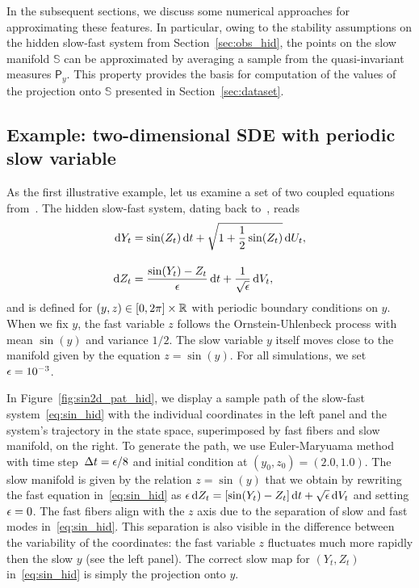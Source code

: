 \documentclass{article}
\newcommand{\sman}{\mathbb{S}} %
\newcommand{\invm}{\mathsf{P}} %
\begin{document}
In the subsequent sections, we discuss some numerical approaches for approximating these features. In particular, owing to the stability assumptions on the hidden slow-fast system from Section~\ref{sec:obs_hid}, the points on the slow manifold $\sman$ can be approximated by averaging a sample from the quasi-invariant measures $\invm_{\!y}$. This property provides the basis for computation of the values of the projection onto $\sman$ presented in Section~\ref{sec:dataset}.

\subsection{Example: two-dimensional SDE with periodic slow variable}
\label{sec:example}
As the first illustrative example, let us examine a set of two coupled equations from~\cite{froyland_trajectory-free_2016}. The hidden slow-fast system, dating back to~\cite{crommelin_reconstruction_2006}, reads
\begin{gather}\label{eq:sin_hid}
    \begin{aligned}
        \operatorname{d}\!{Y_t} &= \sin(Z_t)\operatorname{d}\!{t} + \sqrt{1+\frac{1}{2}\sin(Z_t)}\operatorname{d}\!{U_t},\\[1em]
        \operatorname{d}\!{Z_t} &= \frac{\sin(Y_t) - Z_t}{\epsilon}\operatorname{d}\!{t} + \frac{1}{\sqrt{\epsilon}}\operatorname{d}\!{V_t},
    \end{aligned}
\end{gather}
and is defined for $(y,z)\in[0,2\pi]\times\mathbb{R}$ with periodic boundary conditions on $y$. When we fix $y$, the fast variable $z$ follows the Ornstein-Uhlenbeck process with mean $\sin(y)$ and variance $1/2$. The slow variable $y$ itself moves close to the manifold given by the equation $z=\sin(y)$. For all simulations, we set $\epsilon=10^{-3}$.

In Figure~\ref{fig:sin2d_pat_hid}, we display a sample path of the slow-fast system~\eqref{eq:sin_hid} with the individual coordinates in the left panel and the system's trajectory in the state space, superimposed by fast fibers and slow manifold, on the right. To generate the path, we use Euler-Maryuama method with time step~$\Delta t=\epsilon/8$ and initial condition at $(y_0, z_0)=(2.0, 1.0)$. The slow manifold is given by the relation $z = \sin(y)$ that we obtain by rewriting the fast equation in~\eqref{eq:sin_hid} as $\epsilon\operatorname{d}\!{Z}_t = [\sin(Y_t)-Z_t]\operatorname{d}\!{t} +\sqrt{\epsilon}\operatorname{d}\!{V}_t$ and setting $\epsilon=0$. The fast fibers align with the $z$ axis due to the separation of slow and fast modes in~\eqref{eq:sin_hid}. This separation is also visible in the difference between the variability of the coordinates: the fast variable $z$ fluctuates much more rapidly then the slow $y$ (see the left panel). The correct slow map for $(Y_t, Z_t)$ in~\eqref{eq:sin_hid} is simply the projection onto $y$.
\end{document}
